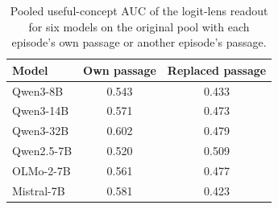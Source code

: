 \begin{table}[!htbp]
\centering
\caption{Pooled useful-concept AUC of the logit-lens readout for six models on the original pool with each episode's own passage or another episode's passage.}
\label{tab:readoutshuffle}
\small
\setlength{\tabcolsep}{5pt}
\begin{tabular}{@{}lcc@{}}
\toprule
Model & Own passage & Replaced passage \\
\midrule
Qwen3-8B & 0.543 & 0.433 \\
Qwen3-14B & 0.571 & 0.473 \\
Qwen3-32B & 0.602 & 0.479 \\
Qwen2.5-7B & 0.520 & 0.509 \\
OLMo-2-7B & 0.561 & 0.477 \\
Mistral-7B & 0.581 & 0.423 \\
\bottomrule
\end{tabular}
\end{table}
